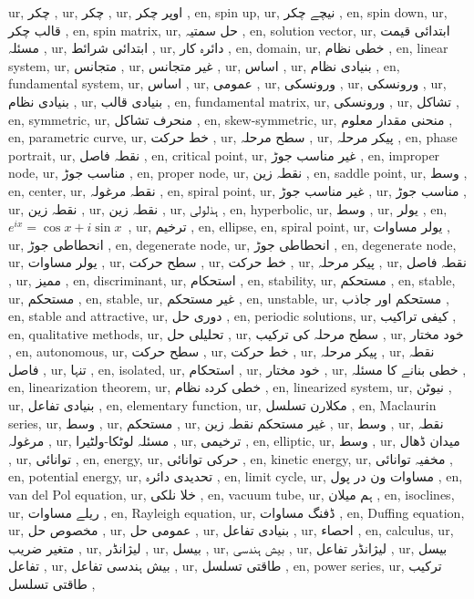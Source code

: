 ur, چکر ,
ur, چکر ,
ur, اوپر چکر ,
en, spin up,
ur, نیچے چکر ,
en, spin down,
ur, قالب چکر ,
en, spin matrix,
ur, حل سمتیہ ,
en, solution vector,
ur, ابتدائی قیمت مسئلہ ,
ur, ابتدائی شرائط ,
ur, دائرہ کار ,
en, domain,
ur, خطی نظام ,
en, linear system,
ur, متجانس ,
ur, غیر متجانس ,
ur, اساس ,
ur, بنیادی نظام ,
en, fundamental system,
ur, اساس ,
ur, عمومی ,
ur, ورونسکی ,
ur, ورونسکی ,
ur, بنیادی نظام ,
ur, بنیادی قالب ,
en, fundamental matrix,
ur, ورونسکی ,
ur, تشاکل ,
en, symmetric,
ur, منحرف تشاکل ,
en, skew-symmetric,
ur, منحنی مقدار معلوم ,
en, parametric curve,
ur, خط حرکت ,
ur, سطح مرحلہ ,
ur, پیکر مرحلہ ,
en, phase portrait,
ur, نقطہ فاصل ,
en, critical point,
ur, غیر مناسب جوڑ ,
en, improper node,
ur, مناسب جوڑ ,
en, proper node,
ur, نقطہ زین ,
en, saddle point,
ur, وسط ,
en, center,
ur, نقطہ مرغولہ ,
en, spiral point,
ur, غیر مناسب جوڑ ,
ur, مناسب جوڑ ,
ur, نقطہ زین ,
ur, نقطہ زین ,
ur, ہذلولی ,
en, hyperbolic,
ur, وسط ,
ur, یولر ,
en, $e^{ix}=\cos x+i\sin x\,\,\,$,
ur, ترخیم ,
en, ellipse,
en, spiral point,
ur, یولر مساوات ,
ur, انحطاطی جوڑ ,
en, degenerate node,
ur, انحطاطی جوڑ ,
en, degenerate node,
ur, یولر مساوات ,
ur, سطح حرکت ,
ur, خط حرکت ,
ur, پیکر مرحلہ ,
ur, نقطہ فاصل ,
ur, ممیز ,
en, discriminant,
ur, استحکام ,
en, stability,
ur, مستحکم ,
en, stable,
ur, مستحکم ,
en, stable,
ur, غیر مستحکم ,
en, unstable,
ur, مستحکم اور جاذب ,
en, stable and attractive,
ur, دوری حل ,
en, periodic solutions,
ur, کیفی تراکیب ,
en, qualitative methods,
ur, تحلیلی حل ,
ur, سطح مرحلہ کی ترکیب ,
ur, خود مختار ,
en, autonomous,
ur, سطح حرکت ,
ur, خط حرکت ,
ur, پیکر مرحلہ ,
ur, نقطہ فاصل ,
ur, تنہا ,
en, isolated,
ur, استحکام ,
ur, خود مختار ,
ur, خطی بنانے کا مسئلہ ,
en, linearization theorem,
ur, خطی کردہ نظام ,
en, linearized system,
ur, نیوٹن ,
ur, بنیادی تفاعل ,
en, elementary function,
ur, مکلارن تسلسل ,
en, Maclaurin series,
ur, وسط ,
ur, مستحکم ,
ur, غیر مستحکم نقطہ زین ,
ur, وسط ,
ur, نقطہ مرغولہ ,
ur, مسئلہ لوٹکا-ولٹیرا ,
ur, ترخیمی ,
en, elliptic,
ur, وسط ,
ur, میدان ڈھال ,
ur, توانائی ,
en, energy,
ur, حرکی توانائی ,
en, kinetic energy,
ur, مخفیہ توانائی ,
en, potential energy,
ur, تحدیدی دائرہ ,
en, limit cycle,
ur, مساوات ون در پول ,
en, van del Pol equation,
ur, خلا نلکی ,
en, vacuum tube,
ur, ہم میلان ,
en, isoclines,
ur, ریلے مساوات ,
en, Rayleigh equation,
ur, ڈفنگ مساوات ,
en, Duffing equation,
ur, مخصوص حل ,
ur, عمومی حل ,
ur, بنیادی تفاعل ,
ur, احصاء ,
en, calculus,
ur, متغیر ضریب  ,
ur, لیژانڈر ,
ur, بیسل ,
ur, بیش ہندسی ,
ur, لیژانڈر تفاعل ,
ur, بیسل تفاعل ,
ur, بیش ہندسی تفاعل ,
ur, طاقتی تسلسل ,
en, power series,
ur, ترکیب طاقتی تسلسل ,
